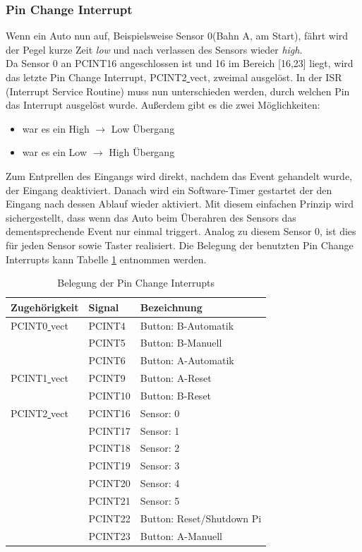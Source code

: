 \documentclass[a4paper, 11pt]{report}
\begin{document}
			\subsubsection {Pin Change Interrupt}\label{subsubsec:PCINT}
			Wenn ein Auto nun auf, Beispielsweise Sensor 0(Bahn A, am Start), fährt wird der Pegel kurze Zeit \emph{low} und nach verlassen des Sensors wieder \emph{high}.\\ Da Sensor 0 an PCINT16 angeschlossen ist und 16 im Bereich [16,23] liegt, wird das letzte Pin Change Interrupt, PCINT2\underline{ }vect, zweimal ausgelöst. In der ISR (Interrupt Service Routine) muss nun unterschieden werden, durch welchen Pin das Interrupt ausgelöst wurde.
			Außerdem gibt es die zwei Möglichkeiten:
				\begin{itemize}
					\item war es ein High $\rightarrow$ Low Übergang
					\item war es ein Low $\rightarrow$ High Übergang
				\end{itemize}

			Zum Entprellen des Eingangs wird direkt, nachdem das Event gehandelt wurde, der Eingang deaktiviert. Danach wird ein Software-Timer gestartet der den Eingang nach dessen Ablauf wieder aktiviert. Mit diesem einfachen Prinzip wird sichergestellt, dass wenn das Auto beim Überahren des Sensors das dementsprechende Event nur einmal triggert.
			Analog zu diesem Sensor 0, ist dies für jeden Sensor sowie Taster realisiert. Die Belegung der benutzten Pin Change Interrupts kann Tabelle \ref{tab:belegungpcint} entnommen werden.
			\begin{table}[ht]
				\begin{tabular}{|l|l|l|}
					\hline
					Zugehörigkeit & Signal & Bezeichnung\\
					\hline
					\hline
					PCINT0\underline{ }vect & PCINT4 & Button: B-Automatik\\
					\hline
											& PCINT5 & Button: B-Manuell\\
					\hline
											& PCINT6 & Button: A-Automatik\\
					\hline
					\hline
					PCINT1\underline{ }vect & PCINT9 & Button: A-Reset\\
					\hline
											& PCINT10 & Button: B-Reset\\
					\hline
					\hline
					PCINT2\underline{ }vect & PCINT16 & Sensor: 0\\
					\hline
											& PCINT17 & Sensor: 1\\
					\hline
											& PCINT18 & Sensor: 2\\
					\hline
											& PCINT19 & Sensor: 3\\
					\hline
											& PCINT20 & Sensor: 4\\
					\hline
											& PCINT21 & Sensor: 5\\
					\hline
											& PCINT22 & Button: Reset/Shutdown Pi\\
					\hline
											& PCINT23 & Button: A-Manuell\\
					\hline
				\end{tabular}
				\caption{Belegung der Pin Change Interrupts}
				\label{tab:belegungpcint}
			\end{table}
\end{document}
